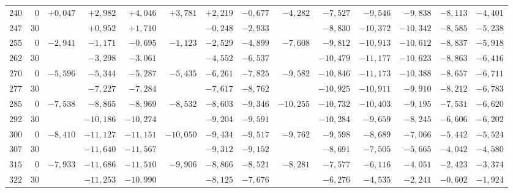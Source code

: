 \begin{landscape}
\begin{longtable}{@{}rr|r|r|r|r|r|r|r|r|r|r|r|r@{}}
\(240\) & \(0\) & \(+0{,}047\) & \(+2{,}982\) & \(+4{,}046\) & \(+3{,}781\) & \(+2{,}219\) & \(-0{,}677\) & \(-4{,}282\) & \(-7{,}527\) & \(-9{,}546\) & \(-9{,}838\) & \(-8{,}113\) & \(-4{,}401\)\\
\(247\) & \(30\) &  & \(+0{,}952\) & \(+1{,}710\) &  & \(-0{,}248\) & \(-2{,}933\) &  & \(-8{,}830\) & \(-10{,}372\) & \(-10{,}342\) & \(-8{,}585\) & \(-5{,}238\)\\
\(255\) & \(0\) & \(-2{,}941\) & \(-1{,}171\) & \(-0{,}695\) & \(-1{,}123\) & \(-2{,}529\) & \(-4{,}899\) & \(-7{,}608\) & \(-9{,}812\) & \(-10{,}913\) & \(-10{,}612\) & \(-8{,}837\) & \(-5{,}918\)\\
\(262\) & \(30\) &  & \(-3{,}298\) & \(-3{,}061\) &  & \(-4{,}552\) & \(-6{,}537\) &  & \(-10{,}479\) & \(-11{,}177\) & \(-10{,}623\) & \(-8{,}863\) & \(-6{,}416\)\\[2pt]
\(270\) & \(0\) & \(-5{,}596\) & \(-5{,}344\) & \(-5{,}287\) & \(-5{,}435\) & \(-6{,}261\) & \(-7{,}825\) & \(-9{,}582\) & \(-10{,}846\) & \(-11{,}173\) & \(-10{,}388\) & \(-8{,}657\) & \(-6{,}711\)\\
\(277\) & \(30\) &  & \(-7{,}227\) & \(-7{,}284\) &  & \(-7{,}617\) & \(-8{,}762\) &  & \(-10{,}925\) & \(-10{,}911\) & \(-9{,}910\) & \(-8{,}212\) & \(-6{,}783\)\\
\(285\) & \(0\) & \(-7{,}538\) & \(-8{,}865\) & \(-8{,}969\) & \(-8{,}532\) & \(-8{,}603\) & \(-9{,}346\) & \(-10{,}255\) & \(-10{,}732\) & \(-10{,}403\) & \(-9{,}195\) & \(-7{,}531\) & \(-6{,}620\)\\
\(292\) & \(30\) &  & \(-10{,}186\) & \(-10{,}274\) &  & \(-9{,}204\) & \(-9{,}591\) &  & \(-10{,}284\) & \(-9{,}659\) & \(-8{,}245\) & \(-6{,}606\) & \(-6{,}202\)\\[2pt]
\(300\) & \(0\) & \(-8{,}410\) & \(-11{,}127\) & \(-11{,}151\) & \(-10{,}050\) & \(-9{,}434\) & \(-9{,}517\) & \(-9{,}762\) & \(-9{,}598\) & \(-8{,}689\) & \(-7{,}066\) & \(-5{,}442\) & \(-5{,}524\)\\
\(307\) & \(30\) &  & \(-11{,}640\) & \(-11{,}567\) &  & \(-9{,}312\) & \(-9{,}152\) &  & \(-8{,}691\) & \(-7{,}505\) & \(-5{,}665\) & \(-4{,}042\) & \(-4{,}580\)\\
\(315\) & \(0\) & \(-7{,}933\) & \(-11{,}686\) & \(-11{,}510\) & \(-9{,}906\) & \(-8{,}866\) & \(-8{,}521\) & \(-8{,}281\) & \(-7{,}577\) & \(-6{,}116\) & \(-4{,}051\) & \(-2{,}423\) & \(-3{,}374\)\\
\(322\) & \(30\) &  & \(-11{,}253\) & \(-10{,}990\) &  & \(-8{,}125\) & \(-7{,}676\) &  & \(-6{,}276\) & \(-4{,}535\) & \(-2{,}241\) & \(-0{,}602\) & \(-1{,}924\)\\[2pt]

\end{longtable}
\end{landscape}
